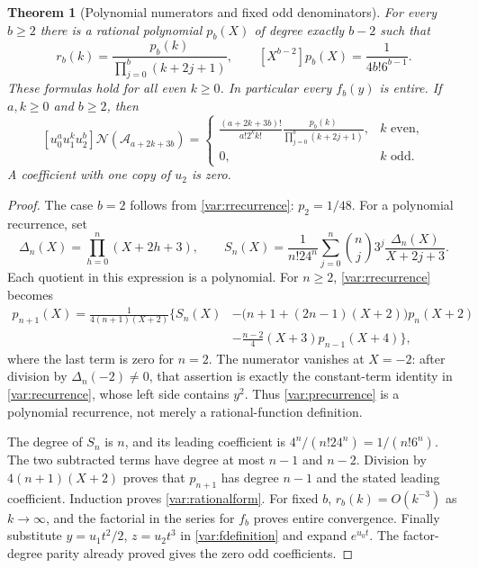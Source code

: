 \documentclass[11pt,letterpaper]{article}
\numberwithin{equation}{section}
\theoremstyle{plain}
\newtheorem{theorem}{Theorem}[section]
\theoremstyle{definition}
\theoremstyle{remark}
\newcommand{\NN}{\mathcal N}\newcommand{\HH}{\mathcal H}
\newcommand{\Acal}{\mathcal A}\newcommand{\cA}{\mathcal A}
\begin{document}
\begin{theorem}[Polynomial numerators and fixed odd denominators]
\label{var:rational}
For every $b\ge2$ there is a rational polynomial $p_b(X)$ of degree
exactly $b-2$ such that
\begin{equation}\label{var:rationalform}
 \boxed{\displaystyle
 r_b(k)=\frac{p_b(k)}{\prod_{j=0}^{b}(k+2j+1)},\qquad
 [X^{b-2}]p_b(X)=\frac1{4b!6^{b-1}}.}
\end{equation}
These formulas hold for all even $k\ge0$. In particular every
$f_b(y)$ is entire. If $a,k\ge0$ and $b\ge2$, then
\begin{equation}\label{var:allcoefficients}
 [u_0^au_1^ku_2^b]\NN(\Acal_{a+2k+3b})
 =\begin{cases}
 \displaystyle\frac{(a+2k+3b)!}{a!2^kk!}
       \frac{p_b(k)}{\prod_{j=0}^b(k+2j+1)},& k\text{ even},\\[5pt]
 0,&k\text{ odd}.
 \end{cases}
\end{equation}
A coefficient with one copy of $u_2$ is zero.
\end{theorem}
\begin{proof}
The case $b=2$ follows from \eqref{var:rrecurrence}:
$p_2=1/48$. For a polynomial recurrence, set
\[
 \Delta_n(X)=\prod_{h=0}^n(X+2h+3),\qquad
 S_n(X)=\frac1{n!24^n}\sum_{j=0}^n
       \binom nj3^j\frac{\Delta_n(X)}{X+2j+3}.
\]
Each quotient in this expression is a polynomial. For $n\ge2$,
\eqref{var:rrecurrence} becomes
\begin{equation}\label{var:precurrence}
\begin{split}
 p_{n+1}(X)=\frac1{4(n+1)(X+2)}\bigg\{
 S_n(X)&-\bigl(n+1+(2n-1)(X+2)\bigr)p_n(X+2)\\
 &-\frac{n-2}{4}(X+3)p_{n-1}(X+4)\bigg\},
\end{split}
\end{equation}
where the last term is zero for $n=2$.
The numerator vanishes at $X=-2$: after division by
$\Delta_n(-2)\ne0$, that assertion is exactly the constant-term
identity in \eqref{var:recurrence}, whose left side contains $y^2$.
Thus \eqref{var:precurrence} is a polynomial recurrence, not merely
a rational-function definition.

The degree of $S_n$ is $n$, and its leading coefficient is
$4^n/(n!24^n)=1/(n!6^n)$. The two subtracted terms have degree at
most $n-1$ and $n-2$. Division by $4(n+1)(X+2)$ proves that
$p_{n+1}$ has degree $n-1$ and the stated leading coefficient.
Induction proves \eqref{var:rationalform}.
For fixed $b$, $r_b(k)=O(k^{-3})$ as $k\to\infty$, and the
factorial in the series for $f_b$ proves entire convergence.
Finally substitute $y=u_1t^2/2$, $z=u_2t^3$ in
\eqref{var:fdefinition} and expand $e^{u_0t}$.
The factor-degree parity already proved gives the zero odd coefficients.
\end{proof}
\end{document}
